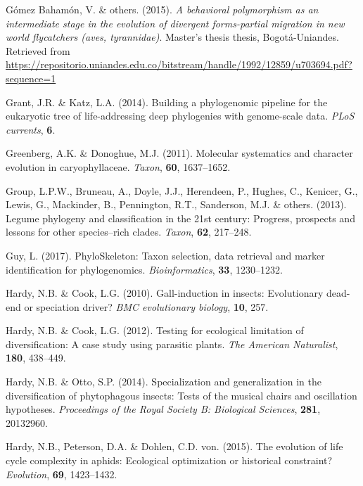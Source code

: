 \documentclass[]{article}
\begin{document}
\leavevmode\hypertarget{ref-gomez2015behavioral}{}%
Gómez Bahamón, V. \& others. (2015). \emph{A behavioral polymorphism as an intermediate stage in the evolution of divergent forms-partial migration in new world flycatchers (aves, tyrannidae)}. Master's thesis thesis, Bogotá-Uniandes. Retrieved from \url{https://repositorio.uniandes.edu.co/bitstream/handle/1992/12859/u703694.pdf?sequence=1}

\leavevmode\hypertarget{ref-grant2014building}{}%
Grant, J.R. \& Katz, L.A. (2014). Building a phylogenomic pipeline for the eukaryotic tree of life-addressing deep phylogenies with genome-scale data. \emph{PLoS currents}, \textbf{6}.

\leavevmode\hypertarget{ref-greenberg2011caryophyllaceae}{}%
Greenberg, A.K. \& Donoghue, M.J. (2011). Molecular systematics and character evolution in caryophyllaceae. \emph{Taxon}, \textbf{60}, 1637--1652.

\leavevmode\hypertarget{ref-legume2013legume}{}%
Group, L.P.W., Bruneau, A., Doyle, J.J., Herendeen, P., Hughes, C., Kenicer, G., Lewis, G., Mackinder, B., Pennington, R.T., Sanderson, M.J. \& others. (2013). Legume phylogeny and classification in the 21st century: Progress, prospects and lessons for other species--rich clades. \emph{Taxon}, \textbf{62}, 217--248.

\leavevmode\hypertarget{ref-guy2017phyloskeleton}{}%
Guy, L. (2017). PhyloSkeleton: Taxon selection, data retrieval and marker identification for phylogenomics. \emph{Bioinformatics}, \textbf{33}, 1230--1232.

\leavevmode\hypertarget{ref-hardy2010gall}{}%
Hardy, N.B. \& Cook, L.G. (2010). Gall-induction in insects: Evolutionary dead-end or speciation driver? \emph{BMC evolutionary biology}, \textbf{10}, 257.

\leavevmode\hypertarget{ref-hardy2012testing}{}%
Hardy, N.B. \& Cook, L.G. (2012). Testing for ecological limitation of diversification: A case study using parasitic plants. \emph{The American Naturalist}, \textbf{180}, 438--449.

\leavevmode\hypertarget{ref-hardy2014specialization}{}%
Hardy, N.B. \& Otto, S.P. (2014). Specialization and generalization in the diversification of phytophagous insects: Tests of the musical chairs and oscillation hypotheses. \emph{Proceedings of the Royal Society B: Biological Sciences}, \textbf{281}, 20132960.

\leavevmode\hypertarget{ref-hardy2015evolution}{}%
Hardy, N.B., Peterson, D.A. \& Dohlen, C.D. von. (2015). The evolution of life cycle complexity in aphids: Ecological optimization or historical constraint? \emph{Evolution}, \textbf{69}, 1423--1432.
\end{document}
